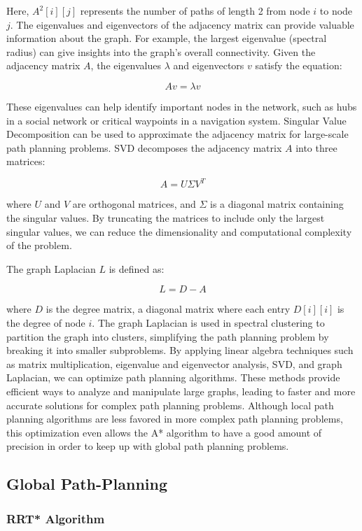 \documentclass[12pt]{article}
\begin{document}
Here, \( A^2[i][j] \) represents the number of paths of length 2 from node \( i \) to node \( j \). The eigenvalues and eigenvectors of the adjacency matrix can provide valuable information about the graph. For example, the largest eigenvalue (spectral radius) can give insights into the graph's overall connectivity. Given the adjacency matrix \( A \), the eigenvalues \( \lambda \) and eigenvectors \( v \) satisfy the equation:

\[
A v = \lambda v
\]

These eigenvalues can help identify important nodes in the network, such as hubs in a social network or critical waypoints in a navigation system. Singular Value Decomposition can be used to approximate the adjacency matrix for large-scale path planning problems. SVD decomposes the adjacency matrix \( A \) into three matrices:

\[
A = U \Sigma V^T
\]

where \( U \) and \( V \) are orthogonal matrices, and \( \Sigma \) is a diagonal matrix containing the singular values. By truncating the matrices to include only the largest singular values, we can reduce the dimensionality and computational complexity of the problem.

The graph Laplacian \( L \) is defined as:

\[
L = D - A
\]

where \( D \) is the degree matrix, a diagonal matrix where each entry \( D[i][i] \) is the degree of node \( i \). The graph Laplacian is used in spectral clustering to partition the graph into clusters, simplifying the path planning problem by breaking it into smaller subproblems. By applying linear algebra techniques such as matrix multiplication, eigenvalue and eigenvector analysis, SVD, and graph Laplacian, we can optimize path planning algorithms. These methods provide efficient ways to analyze and manipulate large graphs, leading to faster and more accurate solutions for complex path planning problems. Although local path planning algorithms are less favored in more complex path planning problems, this optimization even allows the A* algorithm to have a good amount of precision in order to keep up with global path planning problems. 
\newpage
\subsection{Global Path-Planning}
\subsubsection{RRT* Algorithm}
\end{document}
